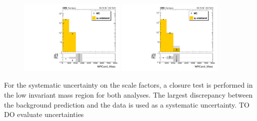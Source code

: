 \begin{figure}[htbp]
  \includegraphics[width=0.45\textwidth]{figures/2018/Boosted_elFatJet_WRCand_Mass_HNWR_SingleElectron_Boosted_SR_TTLX_powheg.pdf}
  \hspace{0.01\textwidth}
  \includegraphics[width=0.45\textwidth]{figures/2018/Boosted_muFatJet_WRCand_Mass_HNWR_SingleMuon_Boosted_SR_TTLX_powheg.pdf}

  \label{fig:emuMCEMuCompBoosted}
\end{figure}


For the systematic uncertainty on the scale factors, a closure test is performed in the low invariant mass region for both analyses.
The largest discrepancy between the background prediction and the data is used as a systematic uncertainty.
{\color{red}TO DO evaluate uncertainties}

